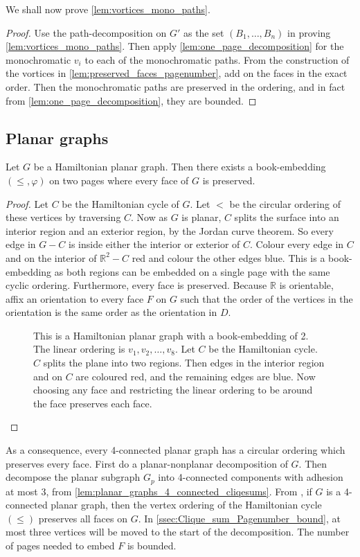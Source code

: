 We shall now prove \cref{lem:vortices_mono_paths}.
\begin{proof}
	Use the path-decomposition on \(G'\) as the set \((B_1, \ldots , B_n)\) in proving \cref{lem:vortices_mono_paths}. Then apply \cref{lem:one_page_decomposition} for the monochromatic \(v_i\) to each of the monochromatic paths. From the construction of the vortices in \cref{lem:preserved_faces_pagenumber}, add on the faces in the exact order. Then the monochromatic paths are preserved in the ordering, and in fact from \cref{lem:one_page_decomposition}, they are bounded.
\end{proof}
\subsection{Planar graphs}
\begin{lemma}\label{lem:Hamiltonian_preserved_faces}
	Let \(G\) be a Hamiltonian planar graph. Then there exists a book-embedding $(\leq, \varphi)$ on two pages where every face of $G$ is preserved.
\end{lemma}

\begin{proof}
	Let \(C\) be the Hamiltonian cycle of \(G\). Let \(<\) be the circular ordering of these vertices by traversing \(C\). Now as \(G\) is planar, \(C\) splits the surface into an interior region and an exterior region, by the Jordan curve theorem. So every edge in $G - C$ is inside either the interior or exterior of \(C\). Colour every edge in $C$ and on the interior of $\mathbb{R}^2 - C$ red and colour the other edges blue. This is a book-embedding as both regions can be embedded on a single page with the same cyclic ordering. Furthermore, every face is preserved. Because $\mathbb{R}$ is orientable, affix an orientation to every face \(F\) on $G$ such that the order of the vertices in the orientation is the same order as the orientation in \(D\).
	\begin{figure}[h!]
		\centering
		
		\caption[Hamiltonian planar graph]{This is a Hamiltonian planar graph with a book-embedding of 2. The linear ordering is $v_1, v_2, \ldots,  v_8$. Let $C$ be the Hamiltonian cycle. $C$ splits the plane into two regions. Then edges in the interior region and on $C$ are coloured red, and the remaining edges are blue. Now choosing any face and restricting the linear ordering to be around the face preserves each face. }\label{fig:hamiltonian_planar}
	\end{figure}
\end{proof}
As a consequence, every 4-connected planar graph has a circular ordering which preserves every face.
First do a planar-nonplanar decomposition of \(G\).
Then decompose the planar subgraph \(G_p\) into 4-connected components with adhesion at most 3, from \cref{lem:planar_graphs_4_connected_cliqesums}.
From \textcite{tutteTheoremPlanarGraphs1956}, if \(G\) is a 4-connected planar graph, then the vertex ordering of the Hamiltonian cycle \((\leq)\) preserves all faces on \(G\).
In \cref{ssec:Clique_sum_Pagenumber_bound}, at most three vertices will be moved to the start of the decomposition. The number of pages needed to embed \(F\) is bounded.


